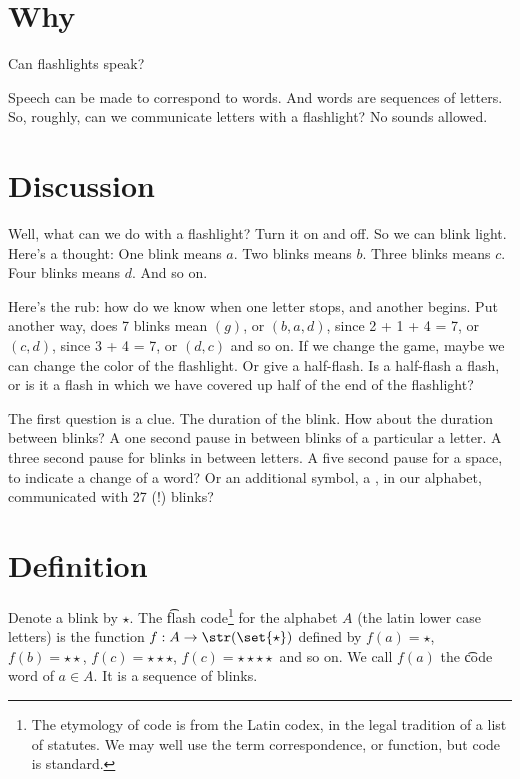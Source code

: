 

\section*{Why}

Can flashlights speak?

Speech can be made to correspond to words.
And words are sequences of letters.
So, roughly, can we communicate letters with a flashlight?
No sounds allowed.

\section*{Discussion}

Well, what can we do with a flashlight?
Turn it on and off.
So we can blink light.
Here's a thought:
One blink means $a$.
Two blinks means $b$.
Three blinks means $c$.
Four blinks means $d$.
And so on.

Here's the rub: how do we know when one letter stops, and another begins.
Put another way, does 7 blinks mean $(g)$, or $(b, a, d)$, since 2 + 1 + 4 = 7, or $(c, d)$, since 3 + 4 = 7, or $(d, c)$ and so on.
If we change the game, maybe we can change the color of the flashlight.
Or give a half-flash.
Is a half-flash a  flash, or is it a flash in which we have covered up half of the end of the flashlight?

The first question is a clue.
The duration of the blink.
How about the duration between blinks?
A one second pause in between blinks of a particular a letter.
A three second pause for blinks in between letters.
A five second pause for a space, to indicate a change of a word?
Or an additional symbol, a , in our alphabet, communicated with 27 (!) blinks?

\newcommand{\blink}{\star}
\newcommand{\pause}{\square}
\section*{Definition}

Denote a blink by $\blink$.
The \t{flash code}\footnote{The etymology of code is from the Latin codex, in the legal tradition of a list of statutes. We may well use the term correspondence, or function, but code is standard.}
for the alphabet $A$ (the latin lower case letters) is the function $f: A \to \str(\set{\blink})$ defined by $f(a) = \blink$, $f(b) = \blink\blink$, $f(c) = \blink\blink\blink$, $f(c) = \blink\blink\blink\blink$ and so on.
We call $f(a)$ the \t{code word} of $a \in A$.
It is a sequence of blinks.

